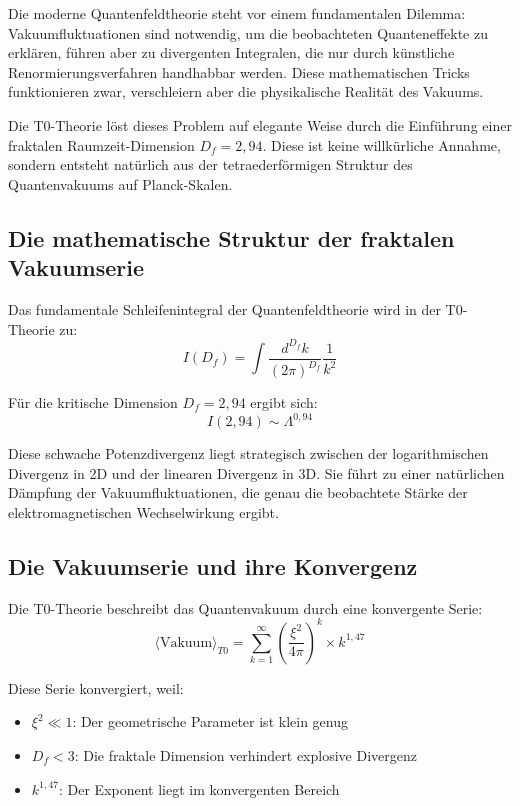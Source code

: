 \documentclass[12pt,a4paper]{article}
\begin{document}
		Die moderne Quantenfeldtheorie steht vor einem fundamentalen Dilemma: Vakuumfluktuationen sind notwendig, um die beobachteten Quanteneffekte zu erkl\"aren, f\"uhren aber zu divergenten Integralen, die nur durch k\"unstliche Renormierungsverfahren handhabbar werden. Diese mathematischen Tricks funktionieren zwar, verschleiern aber die physikalische Realit\"at des Vakuums.
		
		Die T0-Theorie l\"ost dieses Problem auf elegante Weise durch die Einf\"uhrung einer fraktalen Raumzeit-Dimension $D_f = 2{,}94$. Diese ist keine willk\"urliche Annahme, sondern entsteht nat\"urlich aus der tetraederf\"ormigen Struktur des Quantenvakuums auf Planck-Skalen.
		
		\subsection{Die mathematische Struktur der fraktalen Vakuumserie}
		
		Das fundamentale Schleifenintegral der Quantenfeldtheorie wird in der T0-Theorie zu:
		\begin{equation}
			I(D_f) = \int \frac{d^{D_f} k}{(2\pi)^{D_f}} \frac{1}{k^2}
		\end{equation}
		
		F\"ur die kritische Dimension $D_f = 2{,}94$ ergibt sich:
		\begin{equation}
			I(2{,}94) \sim \Lambda^{0{,}94}
		\end{equation}
		
		Diese schwache Potenzdivergenz liegt strategisch zwischen der logarithmischen Divergenz in 2D und der linearen Divergenz in 3D. Sie f\"uhrt zu einer nat\"urlichen D\"ampfung der Vakuumfluktuationen, die genau die beobachtete St\"arke der elektromagnetischen Wechselwirkung ergibt.
		
		\subsection{Die Vakuumserie und ihre Konvergenz}
		
		Die T0-Theorie beschreibt das Quantenvakuum durch eine konvergente Serie:
		\begin{equation}
			\langle \text{Vakuum} \rangle_{T0} = \sum_{k=1}^{\infty} \left(\frac{\xi^2}{4\pi}\right)^k \times k^{1{,}47}
		\end{equation}
		
		Diese Serie konvergiert, weil:
		\begin{itemize}
			\item $\xi^2 \ll 1$: Der geometrische Parameter ist klein genug
			\item $D_f < 3$: Die fraktale Dimension verhindert explosive Divergenz
			\item $k^{1{,}47}$: Der Exponent liegt im konvergenten Bereich
		\end{itemize}
		
\end{document}
